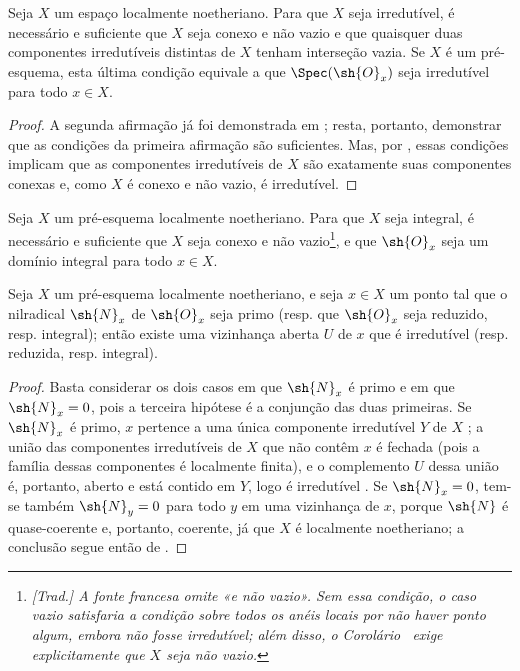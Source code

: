 \documentclass[oneside]{amsart}
\let\EGAOriginalLabel\label
\renewcommand{\label}[1]{\phantomsection\EGAOriginalLabel{#1}}
\begin{document}
\begin{corollary}[6.1.11]
\label{I.6.1.11}
Seja $X$ um espaço localmente noetheriano. Para que $X$ seja irredutível, é
necessário e suficiente que $X$ seja conexo e não vazio e que quaisquer duas
componentes irredutíveis distintas de $X$ tenham interseção vazia. Se $X$ é um
pré-esquema, esta última condição equivale a que $\Spec(\sh{O}_x)$ seja
irredutível para todo $x\in X$.
\end{corollary}

\begin{proof}
A segunda afirmação já foi demonstrada em ; resta, portanto,
demonstrar que as condições da primeira afirmação são suficientes. Mas, por
, essas condições implicam que as componentes irredutíveis de
$X$ são exatamente suas componentes conexas e, como $X$ é conexo e não vazio,
é irredutível.
\end{proof}

\begin{corollary}[6.1.12]
\label{I.6.1.12}
Seja $X$ um pré-esquema localmente noetheriano. Para que $X$ seja integral, é
necessário e suficiente que $X$ seja conexo e não vazio\footnote{\emph{[Trad.]
A fonte francesa omite «e não vazio». Sem essa condição, o caso vazio
satisfaria a condição sobre todos os anéis locais por não haver ponto algum,
embora não fosse irredutível; além disso, o Corolário~ exige
explicitamente que $X$ seja não vazio.}}, e que $\sh{O}_x$ seja um domínio
integral para todo $x\in X$.
\end{corollary}

\begin{proposition}[6.1.13]
\label{I.6.1.13}
Seja $X$ um pré-esquema localmente noetheriano, e seja $x\in X$ um ponto tal
que o nilradical $\sh{N}_x$ de $\sh{O}_x$ seja primo (resp. que $\sh{O}_x$
seja reduzido, resp. integral); então existe uma vizinhança aberta $U$ de $x$
que é irredutível (resp. reduzida, resp. integral).
\end{proposition}

\begin{proof}
Basta considerar os dois casos em que $\sh{N}_x$ é primo e em que
$\sh{N}_x=0$, pois a terceira hipótese é a conjunção das duas primeiras. Se
$\sh{N}_x$ é primo, $x$ pertence a uma única componente irredutível $Y$ de
$X$ ; a união das componentes irredutíveis de $X$ que não
contêm $x$ é fechada (pois a família dessas componentes é localmente finita),
e o complemento $U$ dessa união é, portanto, aberto e está contido em $Y$,
logo é irredutível . Se $\sh{N}_x=0$, tem-se também
$\sh{N}_y=0$ para todo $y$ em uma vizinhança de $x$, porque $\sh{N}$ é
quase-coerente  e, portanto, coerente, já que $X$ é localmente
noetheriano; a conclusão segue então de .
\end{proof}
\end{document}
